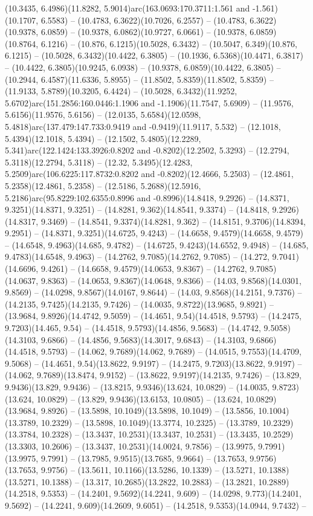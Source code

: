 (10.3435, 6.4986)(11.8282, 5.9014)arc(163.0693:170.3711:1.561 and -1.561)(10.1707, 6.5583) -- (10.4783, 6.3622)(10.7026, 6.2557) -- (10.4783, 6.3622)(10.9378, 6.0859) -- (10.9378, 6.0862)(10.9727, 6.0661) -- (10.9378, 6.0859)(10.8764, 6.1216) -- (10.876, 6.1215)(10.5028, 6.3432) -- (10.5047, 6.349)(10.876, 6.1215) -- (10.5028, 6.3432)(10.4422, 6.3805) -- (10.1936, 6.5368)(10.4471, 6.3817) -- (10.4422, 6.3805)(10.9245, 6.0938) -- (10.9378, 6.0859)(10.4422, 6.3805) -- (10.2944, 6.4587)(11.6336, 5.8955) -- (11.8502, 5.8359)(11.8502, 5.8359) -- (11.9133, 5.8789)(10.3205, 6.4424) -- (10.5028, 6.3432)(11.9252, 5.6702)arc(151.2856:160.0446:1.1906 and -1.1906)(11.7547, 5.6909) -- (11.9576, 5.6156)(11.9576, 5.6156) -- (12.0135, 5.6584)(12.0598, 5.4818)arc(137.479:147.733:0.9419 and -0.9419)(11.9117, 5.532) -- (12.1018, 5.4394)(12.1018, 5.4394) -- (12.1502, 5.4805)(12.2289, 5.341)arc(122.1424:133.3926:0.8202 and -0.8202)(12.2502, 5.3293) -- (12.2794, 5.3118)(12.2794, 5.3118) -- (12.32, 5.3495)(12.4283, 5.2509)arc(106.6225:117.8732:0.8202 and -0.8202)(12.4666, 5.2503) -- (12.4861, 5.2358)(12.4861, 5.2358) -- (12.5186, 5.2688)(12.5916, 5.2186)arc(95.8229:102.6355:0.8996 and -0.8996)(14.8418, 9.2926) -- (14.8371, 9.3251)(14.8371, 9.3251) -- (14.8281, 9.362)(14.8541, 9.3374) -- (14.8418, 9.2926)(14.8317, 9.3469) -- (14.8541, 9.3374)(14.8281, 9.362) -- (14.8151, 9.3706)(14.8394, 9.2951) -- (14.8371, 9.3251)(14.6725, 9.4243) -- (14.6658, 9.4579)(14.6658, 9.4579) -- (14.6548, 9.4963)(14.685, 9.4782) -- (14.6725, 9.4243)(14.6552, 9.4948) -- (14.685, 9.4783)(14.6548, 9.4963) -- (14.2762, 9.7085)(14.2762, 9.7085) -- (14.272, 9.7041)(14.6696, 9.4261) -- (14.6658, 9.4579)(14.0653, 9.8367) -- (14.2762, 9.7085)(14.0637, 9.8363) -- (14.0653, 9.8367)(14.0648, 9.8366) -- (14.03, 9.8568)(14.0301, 9.8569) -- (14.0298, 9.8567)(14.0167, 9.8644) -- (14.03, 9.8568)(14.2151, 9.7376) -- (14.2135, 9.7425)(14.2135, 9.7426) -- (14.0035, 9.8722)(13.9685, 9.8921) -- (13.9684, 9.8926)(14.4742, 9.5059) -- (14.4651, 9.54)(14.4518, 9.5793) -- (14.2475, 9.7203)(14.465, 9.54) -- (14.4518, 9.5793)(14.4856, 9.5683) -- (14.4742, 9.5058)(14.3103, 9.6866) -- (14.4856, 9.5683)(14.3017, 9.6843) -- (14.3103, 9.6866)(14.4518, 9.5793) -- (14.062, 9.7689)(14.062, 9.7689) -- (14.0515, 9.7553)(14.4709, 9.5068) -- (14.4651, 9.54)(13.8622, 9.9197) -- (14.2475, 9.7203)(13.8622, 9.9197) -- (14.062, 9.7689)(13.8474, 9.9152) -- (13.8622, 9.9197)(14.2135, 9.7426) -- (13.829, 9.9436)(13.829, 9.9436) -- (13.8215, 9.9346)(13.624, 10.0829) -- (14.0035, 9.8723)(13.624, 10.0829) -- (13.829, 9.9436)(13.6153, 10.0805) -- (13.624, 10.0829)(13.9684, 9.8926) -- (13.5898, 10.1049)(13.5898, 10.1049) -- (13.5856, 10.1004)(13.3789, 10.2329) -- (13.5898, 10.1049)(13.3774, 10.2325) -- (13.3789, 10.2329)(13.3784, 10.2328) -- (13.3437, 10.2531)(13.3437, 10.2531) -- (13.3435, 10.2529)(13.3303, 10.2606) -- (13.3437, 10.2531)(14.0024, 9.7856) -- (13.9975, 9.7991)(13.9975, 9.7991) -- (13.7985, 9.9515)(13.7685, 9.9664) -- (13.7653, 9.9756)(13.7653, 9.9756) -- (13.5611, 10.1166)(13.5286, 10.1339) -- (13.5271, 10.1388)(13.5271, 10.1388) -- (13.317, 10.2685)(13.2822, 10.2883) -- (13.2821, 10.2889)(14.2518, 9.5353) -- (14.2401, 9.5692)(14.2241, 9.609) -- (14.0298, 9.773)(14.2401, 9.5692) -- (14.2241, 9.609)(14.2609, 9.6051) -- (14.2518, 9.5353)(14.0944, 9.7432) -- 